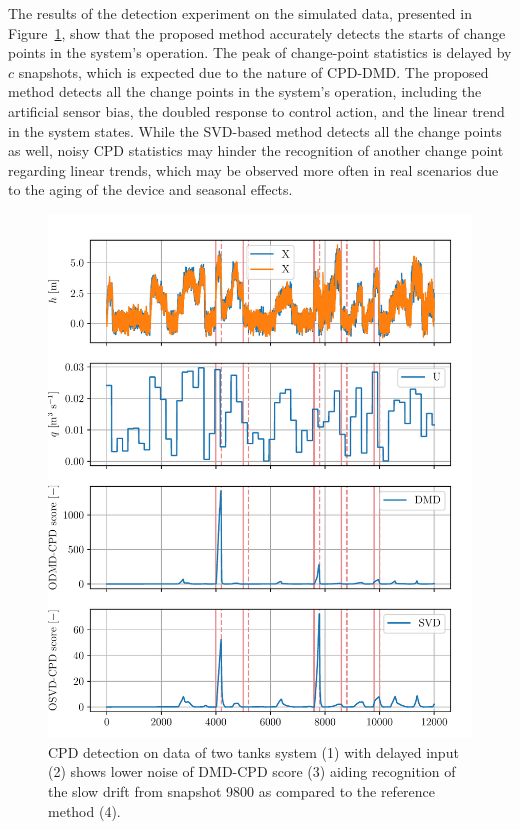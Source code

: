 The results of the detection experiment on the simulated data, presented in Figure~\ref{fig:non-linear}, show that the proposed method accurately detects the starts of change points in the system's operation. The peak of change-point statistics is delayed by \(c\) snapshots, which is expected due to the nature of CPD-DMD\@. The proposed method detects all the change points in the system's operation, including the artificial sensor bias, the doubled response to control action, and the linear trend in the system states. While the SVD-based method detects all the change points as well, noisy CPD statistics may hinder the recognition of another change point regarding linear trends, which may be observed more often in real scenarios due to the aging of the device and seasonal effects.

\begin{figure}[H]
	\centering
	\includegraphics[width=\linewidth]{figures/nonlin-chd_p2_q1-l2000_b200_t200roll_2000-dmd_w1.0-hx15-hl30.pdf}
	\caption{CPD detection on data of two tanks system (1) with delayed input (2) shows lower noise of DMD-CPD score (3) aiding recognition of the slow drift from snapshot 9800 as compared to the reference method (4).}\label{fig:non-linear}
\end{figure}

